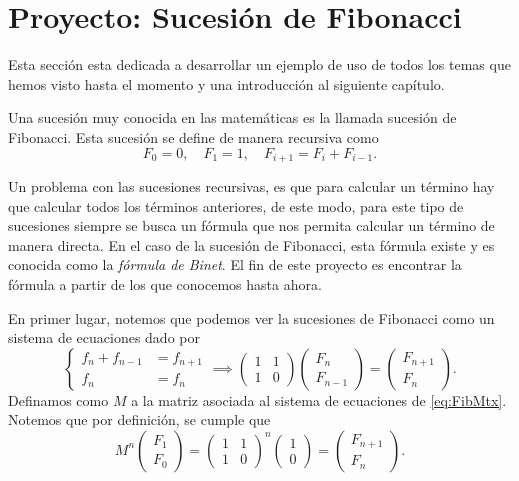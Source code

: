 \section{Proyecto: Sucesión de Fibonacci}

Esta sección esta dedicada a desarrollar un ejemplo de uso de todos los temas que hemos visto hasta el momento y una introducción al siguiente capítulo.

Una sucesión muy conocida en las matemáticas es la llamada sucesión de Fibonacci. Esta sucesión se define de manera recursiva como
\[
  F_0 = 0, \quad F_1 = 1, \quad F_{i+1} = F_i + F_{i-1}.
\]

Un problema con las sucesiones recursivas, es que para calcular un término hay que calcular todos los términos anteriores, de este modo, para este tipo de sucesiones siempre se busca un fórmula que nos permita calcular un término de manera directa. En el caso de la sucesión de Fibonacci, esta fórmula existe y es conocida como la \emph{fórmula de Binet}. El fin de este proyecto es encontrar la fórmula a partir de los que conocemos hasta ahora.

En primer lugar, notemos que podemos ver la sucesiones de Fibonacci como un sistema de ecuaciones dado por
\begin{equation}
  \left\{\begin{aligned}
    f_{n} + f_{n-1} &= f_{n+1} \\
    f_n             &= f_n
  \end{aligned}\right. 
    \implies
  \begin{pmatrix}
   1 & 1 \\ 1 & 0
  \end{pmatrix} \begin{pmatrix}  F_n \\ F_{n-1} \end{pmatrix}
    = \begin{pmatrix}  F_{n+1} \\ F_n \end{pmatrix}.
    \label{eq:FibMtx}
\end{equation}
Definamos como $M$ a la matriz asociada al sistema de ecuaciones de \eqref{eq:FibMtx}. Notemos que por definición, se cumple que
\[
  M^n \begin{pmatrix}  F_1 \\ F_0 \end{pmatrix} 
    = \begin{pmatrix} 1 & 1 \\ 1 & 0 \end{pmatrix}^n  \begin{pmatrix}  1 \\ 0 \end{pmatrix}
    = \begin{pmatrix}  F_{n+1} \\ F_n \end{pmatrix}.
\]

